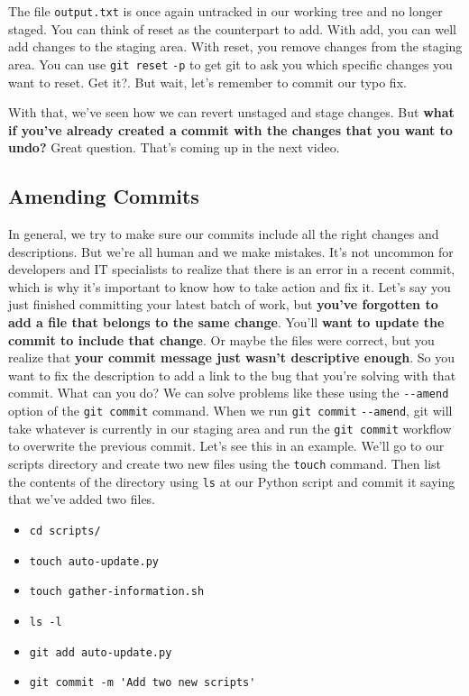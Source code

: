 	The file \verb|output.txt| is once again untracked in our working tree and no longer staged. You can think of reset as the counterpart to add. With add, you can well add changes to the staging area. With reset, you remove changes from the staging area. You can use \texttt{git reset} \verb|-p| to get git to ask you which specific changes you want to reset. Get it?. But wait, let's remember to commit our typo fix.
	
	With that, we've seen how we can revert unstaged and stage changes. But \textbf{what if you've already created a commit with the changes that you want to undo?} Great question. That's coming up in the next video.
	
	\subsection{Amending Commits}
		
	In general, we try to make sure our commits include all the right changes and descriptions. But we're all human and we make mistakes. It's not uncommon for developers and IT specialists to realize that there is an error in a recent commit, which is why it's important to know how to take action and fix it. Let's say you just finished committing your latest batch of work, but \textbf{you've forgotten to add a file that belongs to the same change}. You'll \textbf{want to update the commit to include that change}. Or maybe the files were correct, but you realize that \textbf{your commit message just wasn't descriptive enough}. So you want to fix the description to add a link to the bug that you're solving with that commit. What can you do? We can solve problems like these using the \verb|--amend| option of the \texttt{git commit} command. When we run \texttt{git commit} \verb|--amend|, git will take whatever is currently in our staging area and run the \texttt{git commit} workflow to overwrite the previous commit. Let's see this in an example. We'll go to our scripts directory and create two new files using the \texttt{touch} command. Then list the contents of the directory using \verb|ls| at our Python script and commit it saying that we've added two files.
	
	\begin{itemize}
		\item \verb|cd scripts/|
		\item \verb|touch auto-update.py|
		\item \verb|touch gather-information.sh|
		\item \verb|ls -l|
		\item \verb|git add auto-update.py|
		\item \verb|git commit -m 'Add two new scripts'|
	\end{itemize}
	
